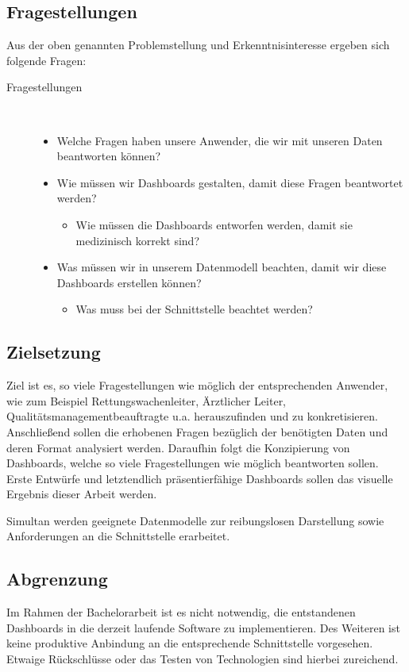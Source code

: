 \subsection{Fragestellungen}
\label{fragen}
Aus der oben genannten Problemstellung und Erkenntnisinteresse ergeben sich folgende Fragen:
\begin{description}
\item[Fragestellungen]~\par
\begin{itemize}
      \item Welche Fragen haben unsere Anwender, die wir mit unseren Daten beantworten können?    
      \item Wie müssen wir Dashboards gestalten, damit diese Fragen beantwortet werden?
      \begin{itemize}
        \item Wie müssen die Dashboards entworfen werden, damit sie medizinisch korrekt sind?  
      \end{itemize}
      \item Was müssen wir in unserem Datenmodell beachten, damit wir diese Dashboards erstellen 					können?
      \begin{itemize}
        \item Was muss bei der Schnittstelle beachtet werden?
      \end{itemize}
\end{itemize}
\end{description}

\subsection{Zielsetzung}
\label{ziel}
Ziel ist es, so viele Fragestellungen wie möglich der entsprechenden Anwender, wie zum Beispiel Rettungswachenleiter, Ärztlicher Leiter, Qualitätsmanagementbeauftragte u.a. herauszufinden und zu konkretisieren.
Anschließend sollen die erhobenen Fragen bezüglich der benötigten Daten und deren Format analysiert werden.
Daraufhin folgt die Konzipierung von Dashboards, welche so viele Fragestellungen wie möglich beantworten sollen.
Erste Entwürfe und letztendlich präsentierfähige Dashboards sollen das visuelle Ergebnis dieser
Arbeit werden.

Simultan werden geeignete Datenmodelle zur reibungslosen Darstellung sowie Anforderungen an die Schnittstelle erarbeitet.

\subsection{Abgrenzung}
\label{abgrenzung}
Im Rahmen der Bachelorarbeit ist es nicht notwendig, die entstandenen Dashboards in die derzeit laufende Software zu implementieren.
Des Weiteren ist keine produktive Anbindung an die entsprechende Schnittstelle vorgesehen.
Etwaige Rückschlüsse oder das Testen von Technologien sind hierbei zureichend.


